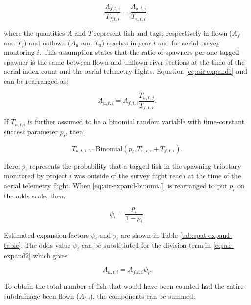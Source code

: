 \documentclass[12pt,]{book}
\theoremstyle{definition}
\theoremstyle{definition}
\theoremstyle{definition}
\theoremstyle{remark}
\begin{document}
\begin{equation}
  \frac{A_{f,t,i}}{T_{f,t,i}} = \frac{A_{u,t,i}}{T_{u,t,i}},
  \label{eq:air-expand1}
\end{equation}

\noindent
where the quantities \(A\) and \(T\) represent fish and tags,
respectively in flown (\(A_f\) and \(T_f\)) and unflown (\(A_u\) and
\(T_u\)) reaches in year \(t\) and for aerial survey montoring \(i\).
This assumption states that the ratio of spawners per one tagged spawner
is the same between flown and unflown river sections at the time of the
aerial index count and the aerial telemetry flights. Equation
\eqref{eq:air-expand1} and can be rearranged as:

\begin{equation}
  A_{u,t,i} = A_{f,t,i} \frac{T_{u,t,j}}{T_{f,t,i}}.
  \label{eq:air-expand2}
\end{equation}

\noindent
If \(T_{u,t,i}\) is further assumed to be a binomial random variable
with time-constant success parameter \(p_i\), then:

\begin{equation}
  T_{u,t,i} \sim \text{Binomial}(p_i,T_{u,t,i} + T_{f,t,i}).
  \label{eq:air-expand-binomial}
\end{equation}

\noindent
Here, \(p_i\) represents the probability that a tagged fish in the
spawning tributary monitored by project \(i\) was outside of the survey
flight reach at the time of the aerial telemetry flight. When
\eqref{eq:air-expand-binomial} is rearranged to put \(p_i\) on the odds
scale, then:

\begin{equation}
  \psi_i=\frac{p_i}{1-p_i}.
  \label{eq:air-expand-odds}
\end{equation}

\noindent
Estimated expansion factors \(\psi_i\) and \(p_i\) are shown in Table
\ref{tab:spat-expand-table}. The odds value \(\psi_i\) can be
substitiuted for the division term in \eqref{eq:air-expand2} which gives:

\begin{equation}
  A_{u,t,i} = A_{f,t,i} \psi_i.
  \label{eq:air-expand3}
\end{equation}

\noindent
To obtain the total number of fish that would have been counted had the
entire subdrainage been flown (\(\hat{A}_{t,i}\)), the components can be
summed:
\end{document}
